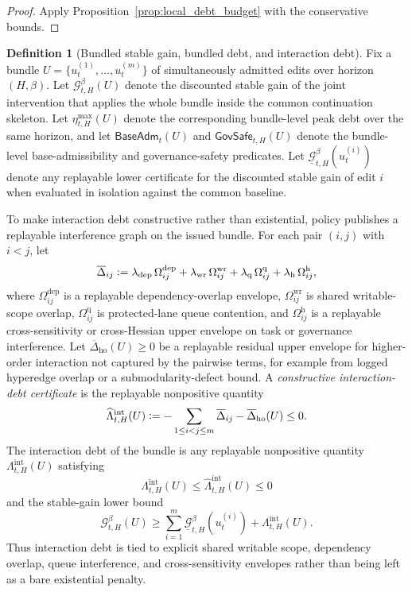 \documentclass[11pt]{article}
\theoremstyle{definition}
\newtheorem{definition}[theorem]{Definition}
\newcommand{\1}{\mathbf{1}}
\newcommand{\Defeq}{\vcentcolon=}
\begin{document}
\begin{proof}
Apply Proposition~\ref{prop:local_debt_budget} with the conservative bounds.
\end{proof}

\begin{definition}[Bundled stable gain, bundled debt, and interaction debt]\label{def:interaction_debt}
Fix a bundle $U=\{u_t^{(1)},\dots,u_t^{(m)}\}$ of simultaneously admitted edits over horizon $(H,\beta)$. Let $\mathcal G_{t,H}^{\beta}(U)$ denote the discounted stable gain of the joint intervention that applies the whole bundle inside the common continuation skeleton. Let $\eta_{t,H}^{\max}(U)$ denote the corresponding bundle-level peak debt over the same horizon, and let $\mathsf{BaseAdm}_t(U)$ and $\mathsf{GovSafe}_{t,H}(U)$ denote the bundle-level base-admissibility and governance-safety predicates. Let $\underline{\mathcal G}_{t,H}^{\beta}(u_t^{(i)})$ denote any replayable lower certificate for the discounted stable gain of edit $i$ when evaluated in isolation against the common baseline.

To make interaction debt constructive rather than existential, policy publishes a replayable interference graph on the issued bundle. For each pair $(i,j)$ with $i<j$, let
\[
\overline\Delta_{ij}
\Defeq
\lambda_{\mathrm{dep}}\,\Omega_{ij}^{\mathrm{dep}}
+\lambda_{\mathrm{wr}}\,\Omega_{ij}^{\mathrm{wr}}
+\lambda_{\mathrm{q}}\,\Omega_{ij}^{\mathrm{q}}
+\lambda_{\mathrm{h}}\,\Omega_{ij}^{\mathrm{h}},
\]
where $\Omega_{ij}^{\mathrm{dep}}$ is a replayable dependency-overlap envelope, $\Omega_{ij}^{\mathrm{wr}}$ is shared writable-scope overlap, $\Omega_{ij}^{\mathrm{q}}$ is protected-lane queue contention, and $\Omega_{ij}^{\mathrm{h}}$ is a replayable cross-sensitivity or cross-Hessian upper envelope on task or governance interference. Let $\overline\Delta_{\mathrm{ho}}(U)\ge 0$ be a replayable residual upper envelope for higher-order interaction not captured by the pairwise terms, for example from logged hyperedge overlap or a submodularity-defect bound. A \emph{constructive interaction-debt certificate} is the replayable nonpositive quantity
\[
\widehat\Lambda_{t,H}^{\mathrm{int}}(U)
\Defeq
-\sum_{1\le i<j\le m}\overline\Delta_{ij}
-\overline\Delta_{\mathrm{ho}}(U)
\le 0.
\]
The interaction debt of the bundle is any replayable nonpositive quantity $\Lambda_{t,H}^{\mathrm{int}}(U)$ satisfying
\[
\Lambda_{t,H}^{\mathrm{int}}(U)\le \widehat\Lambda_{t,H}^{\mathrm{int}}(U)\le 0
\]
and the stable-gain lower bound
\[
\mathcal G_{t,H}^{\beta}(U)\ge \sum_{i=1}^m \underline{\mathcal G}_{t,H}^{\beta}(u_t^{(i)}) + \Lambda_{t,H}^{\mathrm{int}}(U).
\]
Thus interaction debt is tied to explicit shared writable scope, dependency overlap, queue interference, and cross-sensitivity envelopes rather than being left as a bare existential penalty.
\end{definition}
\end{document}
